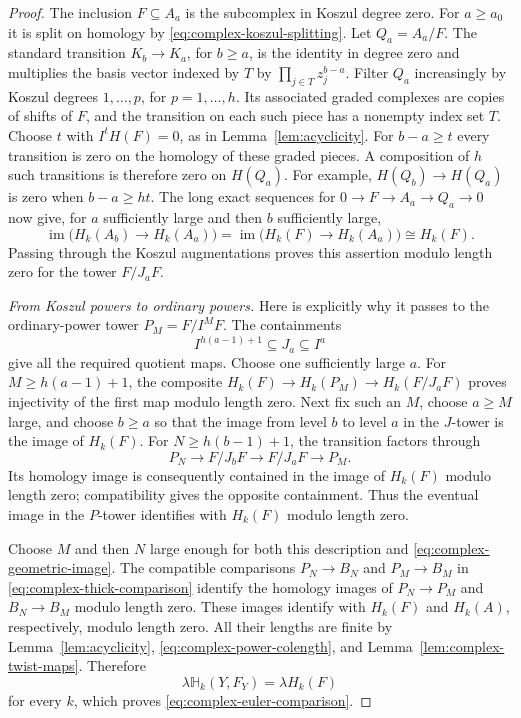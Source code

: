 \begin{proof}
The inclusion $F\subseteq A_a$ is the subcomplex in Koszul degree zero.
For $a\geq a_0$ it is split on homology by
\eqref{eq:complex-koszul-splitting}. Let $Q_a=A_a/F$. The standard
transition $K_b\to K_a$, for $b\geq a$, is the identity in degree zero
and multiplies the basis vector indexed by $T$ by
$\prod_{j\in T}z_j^{b-a}$. Filter $Q_a$ increasingly by Koszul
degrees $1,\ldots,p$, for $p=1,\ldots,h$.
Its associated graded complexes are copies of shifts of $F$, and the
transition on each such piece has a nonempty index set $T$.
Choose $t$ with $I^tH(F)=0$, as in Lemma~\ref{lem:acyclicity}.
For $b-a\geq t$ every transition is zero on the homology of these graded
pieces. A composition of $h$ such transitions is therefore zero on
$H(Q_a)$. For example, $H(Q_b)\to H(Q_a)$ is zero when $b-a\geq ht$.
The long exact sequences for $0\to F\to A_a\to Q_a\to0$ now give,
for $a$ sufficiently large and then $b$ sufficiently large,
\[
 \operatorname{im}\bigl(H_k(A_b)\to H_k(A_a)\bigr)
  =\operatorname{im}\bigl(H_k(F)\to H_k(A_a)\bigr)
  \cong H_k(F).
\]
Passing through the Koszul augmentations proves this assertion modulo
length zero for the tower $F/J_aF$.

\smallskip
\noindent\emph{From Koszul powers to ordinary powers.}
Here is explicitly why it passes to the ordinary-power tower
$P_M=F/I^M F$. The containments
\begin{equation}\label{eq:complex-cofinality}
 I^{h(a-1)+1}\subseteq J_a\subseteq I^a
\end{equation}
give all the required quotient maps. Choose one sufficiently large $a$.
For $M\geq h(a-1)+1$, the composite
$H_k(F)\to H_k(P_M)\to H_k(F/J_aF)$ proves injectivity of the first
map modulo length zero. Next fix such an $M$, choose $a\geq M$ large,
and choose $b\geq a$ so that the image from level $b$ to level $a$ in
the $J$-tower is the image of $H_k(F)$. For $N\geq h(b-1)+1$, the
transition factors through
\[
 P_N\longrightarrow F/J_bF\longrightarrow F/J_aF\longrightarrow P_M.
\]
Its homology image is consequently contained in the image of $H_k(F)$
modulo length zero; compatibility gives the opposite containment. Thus
the eventual image in the $P$-tower identifies with $H_k(F)$ modulo
length zero.

Choose $M$ and then $N$ large enough for both this description and
\eqref{eq:complex-geometric-image}. The compatible comparisons
$P_N\to B_N$ and $P_M\to B_M$ in
\eqref{eq:complex-thick-comparison} identify the homology images of
$P_N\to P_M$ and $B_N\to B_M$ modulo length zero. These images
identify with $H_k(F)$ and $H_k(A)$, respectively, modulo length zero.
All their lengths are finite by
Lemma~\ref{lem:acyclicity}, \eqref{eq:complex-power-colength}, and
Lemma~\ref{lem:complex-twist-maps}. Therefore
\[
 \lambda\mathbb H_k(Y,F_Y)=\lambda H_k(F)
\]
for every $k$, which proves \eqref{eq:complex-euler-comparison}.


\end{proof}

